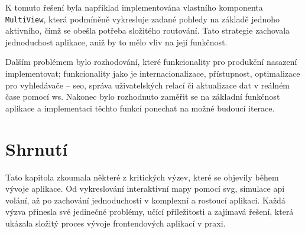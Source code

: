 K tomuto řešení byla například implementována vlastního komponenta \texttt{MultiView}, která podmíněně vykresluje zadané pohledy na základě jednoho aktivního, čímž se obešla potřeba složitého routování.
Tato strategie zachovala jednoduchost aplikace, aniž by to mělo vliv na její funkčnost.

Dalším problémem bylo rozhodování, které funkcionality pro produkční nasazení implementovat; funkcionality jako je internacionalizace, přístupnost, optimalizace pro vyhledávače – \ac{seo}, správa uživatelských relací či aktualizace dat v reálném čase pomocí \ac{ws}\cite{mdn_api_websockets_api}.
Nakonec bylo rozhodnuto zaměřit se na základní funkčnost aplikace a implementaci těchto funkcí ponechat na možné budoucí iterace.



\section{Shrnutí}
\label{sec:vyzvy-a-problemy-shrnuti}
Tato kapitola zkoumala některé z kritických výzev, které se objevily během vývoje aplikace.
Od vykreslování interaktivní mapy pomocí \ac{svg}, simulace \ac{api} volání, až po zachování jednoduchosti v komplexní a rostoucí aplikaci.
Každá výzva přinesla své jedinečné problémy, učící příležitosti a zajímavá řešení, která ukázala složitý proces vývoje frontendových aplikací v praxi.
